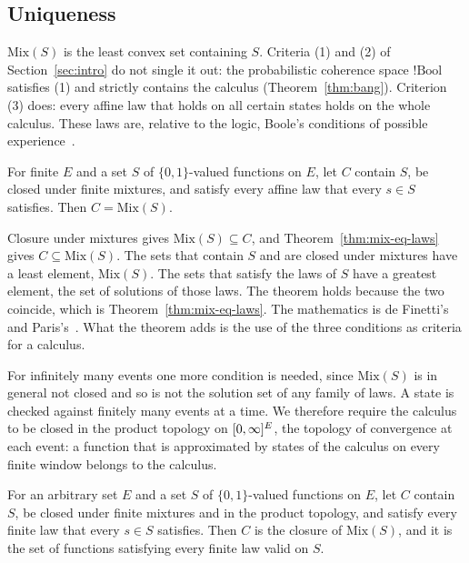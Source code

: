 \subsection{Uniqueness}
\label{sec:recipe-unique}

$\mathrm{Mix}(S)$ is the least convex set containing $S$. Criteria
(1) and (2) of Section~\ref{sec:intro} do not single it out: the
probabilistic coherence space $!\mathrm{Bool}$ satisfies (1) and strictly
contains the calculus (Theorem~\ref{thm:bang}). Criterion (3) does:
every affine law that holds on all certain states holds on the whole
calculus. These laws are, relative to the logic, Boole's conditions of
possible experience~\cite{pitowsky1994}.

\begin{theorem}
\label{thm:unique}
For finite $E$ and a set $S$ of $\{0,1\}$-valued functions on $E$, let
$C$ contain $S$, be closed under finite mixtures, and satisfy every
affine law that every $s \in S$ satisfies. Then $C = \mathrm{Mix}(S)$.
\end{theorem}

\noindent
Closure under mixtures gives $\mathrm{Mix}(S) \subseteq C$, and
Theorem~\ref{thm:mix-eq-laws} gives $C \subseteq \mathrm{Mix}(S)$. The
sets that contain $S$ and are closed under mixtures have a least element,
$\mathrm{Mix}(S)$. The sets that satisfy the laws of $S$ have a greatest
element, the set of solutions of those laws. The theorem holds because
the two coincide, which is Theorem~\ref{thm:mix-eq-laws}. The mathematics
is de Finetti's and Paris's~\cite{definetti1974,paris2001}. What the
theorem adds is the use of the three conditions as criteria for a
calculus.

For infinitely many events one more condition is needed, since
$\mathrm{Mix}(S)$ is in general not closed and so is not the solution set
of any family of laws. A state is checked against finitely many events
at a time. We therefore require the calculus to be closed in the product
topology on $[0,\infty]^{E}$, the topology of convergence at each event: a
function that is approximated by states of the calculus on every finite
window belongs to the calculus.

\begin{theorem}
\label{thm:unique-closed}
For an arbitrary set $E$ and a set $S$ of $\{0,1\}$-valued functions on
$E$, let $C$ contain $S$, be closed under finite mixtures and in the
product topology, and satisfy every finite law that every $s \in S$
satisfies. Then $C$ is the closure of $\mathrm{Mix}(S)$, and it is the
set of functions satisfying every finite law valid on $S$.
\end{theorem}

